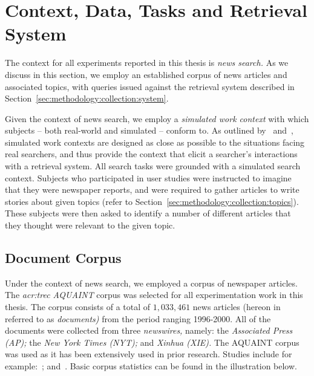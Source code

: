 \section{Context, Data, Tasks and Retrieval System}\label{sec:methodology:collection}
The context for all experiments reported in this thesis is \emph{news search.} As we discuss in this section, we employ an established corpus of news articles and associated topics, with queries issued against the retrieval system described in Section~\ref{sec:methodology:collection:system}.

Given the context of news search, we employ a \emph{simulated work context} with which subjects -- both real-world and simulated -- conform to. As outlined by~\cite{borlund2000simulated_work_tasks} and~\cite{li2013simulated_work_tasks}, simulated work contexts are designed as close as possible to the situations facing real searchers, and thus provide the context that elicit a searcher's interactions with a retrieval system. All search tasks were grounded with a simulated search context. Subjects who participated in user studies were instructed to imagine that they were newspaper reports, and were required to gather articles to write stories about given topics (refer to Section~\ref{sec:methodology:collection:topics}). These subjects were then asked to identify a number of different articles that they thought were relevant to the given topic.

\subsection{Document Corpus}\label{sec:methodology:collection:corpus}
Under the context of news search, we employed a corpus of newspaper articles. The \emph{\gls{acr:trec} AQUAINT} corpus was selected for all experimentation work in this thesis. The corpus consists of a total of $1,033,461$ news articles (hereon in referred to as \emph{documents)} from the period ranging 1996-2000. All of the documents were collected from three \emph{newswires,} namely: the \emph{Associated Press (AP);} the \emph{New York Times (NYT);} and \emph{Xinhua (XIE).} The AQUAINT corpus was used as it has been extensively used in prior research. Studies include for example:~\cite{collinsthompson2004retrieval_quality, ofoghi2006passage_retrieval, baillie2006query_sampling, azzopardi2008retrievability, kelly2009user_study, azzopardi2013query_cost, maxwell2014temporal_delays, harvey2017searching, yang2017can}; and~\cite{wilkie2017bias}. Basic corpus statistics can be found in the illustration below.

